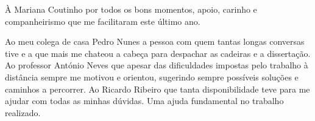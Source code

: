        \TEXT{}
       {À Mariana Coutinho por todos os bons momentos, apoio, carinho e companheirismo que me facilitaram este último ano.}

       \TEXT{}
       {Ao meu colega de casa Pedro Nunes a pessoa com quem tantas longas conversas tive e a que mais me chateou a cabeça para despachar as cadeiras e a dissertação. 
       }
       \TEXT{}
       {Ao professor António Neves que apesar das dificuldades impostas pelo trabalho à distância sempre me motivou e orientou, sugerindo sempre possíveis soluções e caminhos a percorrer. }
       \TEXT{}
       {Ao Ricardo Ribeiro que tanta disponibilidade teve para me ajudar com todas as minhas dúvidas. Uma ajuda fundamental no trabalho realizado.}
\EndTitlePage
\titlepage\ \endtitlepage %


